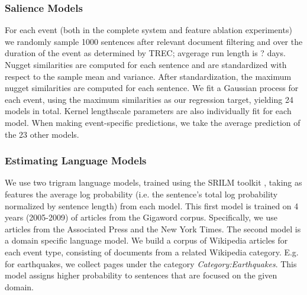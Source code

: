 \subsubsection{Salience Models}
For each event (both in the complete system and feature ablation experiments)
we randomly sample 1000 sentences after relevant document filtering and 
over the duration of the event 
as determined by 
TREC; avgerage run length is ? days.
Nugget similarities
are computed for each sentence and are standardized with respect to 
the sample mean and variance. After standardization, the maximum nugget
similarities are computed for each sentence.
We fit a Gaussian process for each event, using the maximum similarities 
as our regression target, yielding 24 models in total. Kernel lengthscale
parameters are also individually fit for each model.
When making event-specific predictions, we take the average prediction of the
23 other models.

\subsubsection{Estimating Language Models}
We use two trigram language models, trained using the SRILM toolkit
\cite{stolcke2002srilm}, taking as features the average log probability (i.e.
the sentence's total log probability normalized by sentence length) from each
model.  This first model is trained on 4 years (2005-2009) of articles from the
Gigaword corpus.  Specifically, we use articles from the Associated Press and
the New York Times. The second model is a domain specific language model.
We build a corpus of Wikipedia articles for each event type, consisting of documents from a related Wikipedia category. E.g. for earthquakes, we collect pages under the category \emph{Category:Earthquakes}. This model assigns higher probability to sentences that are focused on the given domain.



